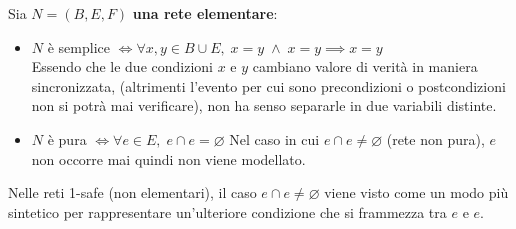 Sia $N = (B,E,F)$ \textbf{una rete elementare}:
\begin{itemize}
    \item $N$ è semplice $\iff \forall x,y \in B \cup E, \;  $\textbullet$ x = $\textbullet$ y \; \land \; x $\textbullet$ = y $\textbullet$ \implies x = y$\\
        Essendo che le due condizioni $x$ e $y$ cambiano valore di verità in maniera sincronizzata, (altrimenti l’evento per cui sono precondizioni o postcondizioni non si potrà mai verificare), non ha senso separarle in due variabili distinte.
    \item $N$ è pura $\iff \forall e \in E, \; $\textbullet$ e \cap e $\textbullet$ = \varnothing$
        Nel caso in cui \textbullet$ e \cap e $\textbullet$ \neq \varnothing$ (rete non pura), $e$ non occorre mai quindi non viene modellato. 
\end{itemize}
  Nelle reti 1-safe (non elementari), il caso \textbullet$ e \cap e $\textbullet$ \neq \varnothing$ viene visto come un modo più sintetico per rappresentare un’ulteriore condizione che si frammezza tra \textbullet$ e$ e $e $\textbullet.